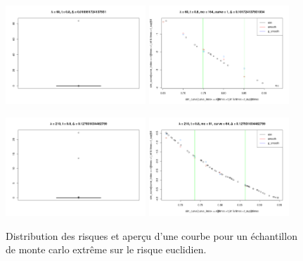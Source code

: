 
\begin{figure}[H]
	\centering
	\begin{minipage}{\linewidth}
		\includegraphics[width=0.47\textwidth]{Images/indiv_vs_glob/qq160.png}
		\includegraphics[width=0.47\textwidth]{Images/indiv_vs_glob/lbd60mc164c1.png}
	\end{minipage}

	\begin{minipage}{\linewidth}
		\includegraphics[width=0.47\textwidth]{Images/indiv_vs_glob/qq210.png}
		\includegraphics[width=0.47\textwidth]{Images/indiv_vs_glob/lbd210_mc91_c64.png}
	\end{minipage}
	\caption{Distribution des risques et aperçu d'une courbe pour un échantillon de monte carlo extrême sur le risque euclidien.}
	\label{fig:dist_R_eucl_curves}
\end{figure}

